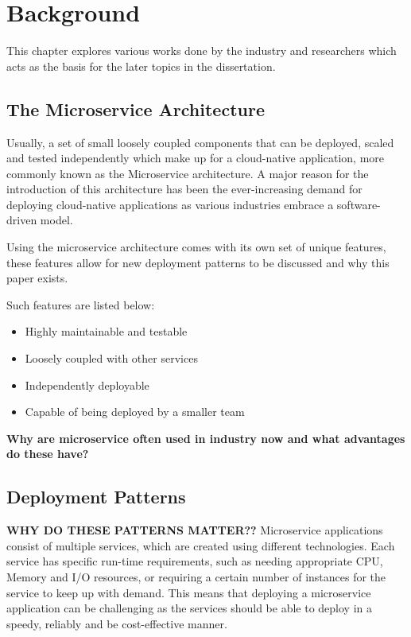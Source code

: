 \chapter{Background}\label{chap:background}
This chapter explores various works done by the industry and researchers which acts as the basis for the later topics in the dissertation. 

\section{The Microservice Architecture}
Usually, a set of small loosely coupled components that can be deployed, scaled and tested independently which make up for a cloud-native application, more commonly known as the Microservice architecture. A major reason for the introduction of this architecture has been the ever-increasing demand for deploying cloud-native applications as various industries embrace a software-driven model. 

Using the microservice architecture comes with its own set of unique features, these features allow for new deployment patterns to be discussed and why this paper exists. 

Such features are listed below: 

\begin{itemize}
    \item Highly maintainable and testable 
    \item Loosely coupled with other services 
    \item Independently deployable 
    \item Capable of being deployed by a smaller team
\end{itemize}

\textbf{Why are microservice often used in industry now and what advantages do these have?}

\section{Deployment Patterns}
\textbf{WHY DO THESE PATTERNS MATTER?? }
Microservice applications consist of multiple services, which are created using different technologies. Each service has specific run-time requirements, such as needing appropriate CPU, Memory and I/O resources, or requiring a certain number of instances for the service to keep up with demand. This means that deploying a microservice application can be challenging as the services should be able to deploy in a speedy, reliably and be cost-effective manner. 

